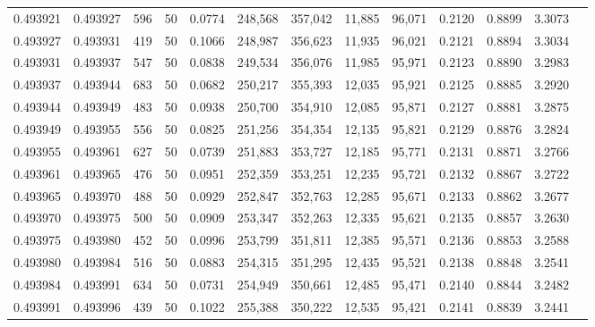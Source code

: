 \begin{tabular}{rrrrrrrrrrrrr}
0.493921 & 0.493927 &   596 &  50 &                                     0.0774 & 248,568 & 357,042 &  11,885 &  96,071 & 0.2120 & 0.8899 & 3.3073 \\
0.493927 & 0.493931 &   419 &  50 &                                     0.1066 & 248,987 & 356,623 &  11,935 &  96,021 & 0.2121 & 0.8894 & 3.3034 \\
0.493931 & 0.493937 &   547 &  50 &                                     0.0838 & 249,534 & 356,076 &  11,985 &  95,971 & 0.2123 & 0.8890 & 3.2983 \\
0.493937 & 0.493944 &   683 &  50 &                                     0.0682 & 250,217 & 355,393 &  12,035 &  95,921 & 0.2125 & 0.8885 & 3.2920 \\
0.493944 & 0.493949 &   483 &  50 &                                     0.0938 & 250,700 & 354,910 &  12,085 &  95,871 & 0.2127 & 0.8881 & 3.2875 \\
0.493949 & 0.493955 &   556 &  50 &                                     0.0825 & 251,256 & 354,354 &  12,135 &  95,821 & 0.2129 & 0.8876 & 3.2824 \\
0.493955 & 0.493961 &   627 &  50 &                                     0.0739 & 251,883 & 353,727 &  12,185 &  95,771 & 0.2131 & 0.8871 & 3.2766 \\
0.493961 & 0.493965 &   476 &  50 &                                     0.0951 & 252,359 & 353,251 &  12,235 &  95,721 & 0.2132 & 0.8867 & 3.2722 \\
0.493965 & 0.493970 &   488 &  50 &                                     0.0929 & 252,847 & 352,763 &  12,285 &  95,671 & 0.2133 & 0.8862 & 3.2677 \\
0.493970 & 0.493975 &   500 &  50 &                                     0.0909 & 253,347 & 352,263 &  12,335 &  95,621 & 0.2135 & 0.8857 & 3.2630 \\
0.493975 & 0.493980 &   452 &  50 &                                     0.0996 & 253,799 & 351,811 &  12,385 &  95,571 & 0.2136 & 0.8853 & 3.2588 \\
0.493980 & 0.493984 &   516 &  50 &                                     0.0883 & 254,315 & 351,295 &  12,435 &  95,521 & 0.2138 & 0.8848 & 3.2541 \\
0.493984 & 0.493991 &   634 &  50 &                                     0.0731 & 254,949 & 350,661 &  12,485 &  95,471 & 0.2140 & 0.8844 & 3.2482 \\
0.493991 & 0.493996 &   439 &  50 &                                     0.1022 & 255,388 & 350,222 &  12,535 &  95,421 & 0.2141 & 0.8839 & 3.2441 \\

\end{tabular}
